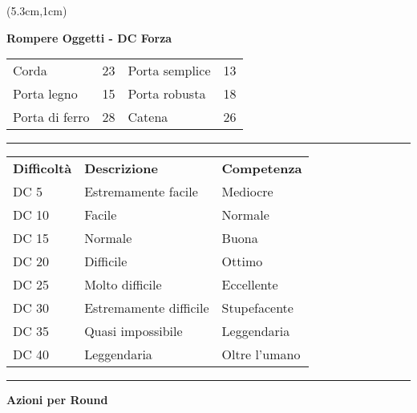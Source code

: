 \documentclass[a4paper,12 pt,openany]{book}
\newcommand{\riga}{\rule{\textwidth}{0.4pt}}
\begin{document}
\begin{textblock*}{8.3cm}(5.3cm,1cm)

\textbf{Rompere Oggetti - DC Forza}\\
\begin{tabular}{ll|ll}
Corda   		   & 23&	Porta semplice         & 13\\
Porta legno        & 15&	Porta robusta          & 18\\
Porta di ferro     & 28&	Catena                 & 26 \\
\end{tabular}

\riga

\begin{tabular}{lll}
\textbf{Difficoltà} & \textbf{Descrizione} & \textbf{Competenza} \\
DC 5           & Estremamente facile              & Mediocre                        \\
DC 10          & Facile                           & Normale                         \\
DC 15          & Normale                          & Buona                           \\
DC 20          & Difficile                        & Ottimo                          \\
DC 25          & Molto difficile                  & Eccellente                      \\
DC 30          & Estremamente difficile           & Stupefacente                    \\
DC 35          & Quasi impossibile                & Leggendaria                     \\
DC 40          & Leggendaria                      & Oltre l'umano                   \\
\end{tabular}


\riga

\textbf{Azioni per Round}


\end{textblock*}
\end{document}

